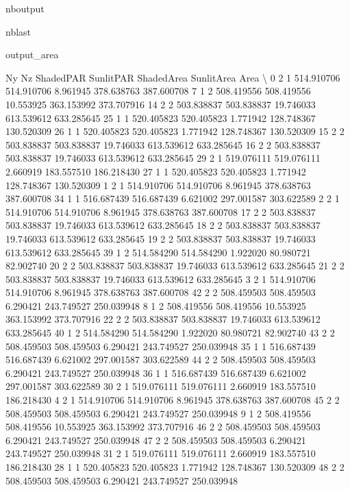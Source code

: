 \documentclass[letterpaper,10pt,english]{sphinxmanual}
\begin{document}
\begin{sphinxuseclass}{nboutput}
\begin{sphinxuseclass}{nblast}
{\begin{sphinxuseclass}{output_area}
\begin{sphinxuseclass}{}
\begin{sphinxVerbatim}[commandchars=\\\{\}]
    Ny  Nz   ShadedPAR   SunlitPAR  ShadedArea  SunlitArea        Area  \textbackslash{}
0    2   1  514.910706  514.910706    8.961945  378.638763  387.600708
7    1   2  508.419556  508.419556   10.553925  363.153992  373.707916
14   2   2  503.838837  503.838837   19.746033  613.539612  633.285645
25   1   1  520.405823  520.405823    1.771942  128.748367  130.520309
26   1   1  520.405823  520.405823    1.771942  128.748367  130.520309
15   2   2  503.838837  503.838837   19.746033  613.539612  633.285645
16   2   2  503.838837  503.838837   19.746033  613.539612  633.285645
29   2   1  519.076111  519.076111    2.660919  183.557510  186.218430
27   1   1  520.405823  520.405823    1.771942  128.748367  130.520309
1    2   1  514.910706  514.910706    8.961945  378.638763  387.600708
34   1   1  516.687439  516.687439    6.621002  297.001587  303.622589
2    2   1  514.910706  514.910706    8.961945  378.638763  387.600708
17   2   2  503.838837  503.838837   19.746033  613.539612  633.285645
18   2   2  503.838837  503.838837   19.746033  613.539612  633.285645
19   2   2  503.838837  503.838837   19.746033  613.539612  633.285645
39   1   2  514.584290  514.584290    1.922020   80.980721   82.902740
20   2   2  503.838837  503.838837   19.746033  613.539612  633.285645
21   2   2  503.838837  503.838837   19.746033  613.539612  633.285645
3    2   1  514.910706  514.910706    8.961945  378.638763  387.600708
42   2   2  508.459503  508.459503    6.290421  243.749527  250.039948
8    1   2  508.419556  508.419556   10.553925  363.153992  373.707916
22   2   2  503.838837  503.838837   19.746033  613.539612  633.285645
40   1   2  514.584290  514.584290    1.922020   80.980721   82.902740
43   2   2  508.459503  508.459503    6.290421  243.749527  250.039948
35   1   1  516.687439  516.687439    6.621002  297.001587  303.622589
44   2   2  508.459503  508.459503    6.290421  243.749527  250.039948
36   1   1  516.687439  516.687439    6.621002  297.001587  303.622589
30   2   1  519.076111  519.076111    2.660919  183.557510  186.218430
4    2   1  514.910706  514.910706    8.961945  378.638763  387.600708
45   2   2  508.459503  508.459503    6.290421  243.749527  250.039948
9    1   2  508.419556  508.419556   10.553925  363.153992  373.707916
46   2   2  508.459503  508.459503    6.290421  243.749527  250.039948
47   2   2  508.459503  508.459503    6.290421  243.749527  250.039948
31   2   1  519.076111  519.076111    2.660919  183.557510  186.218430
28   1   1  520.405823  520.405823    1.771942  128.748367  130.520309
48   2   2  508.459503  508.459503    6.290421  243.749527  250.039948

\end{sphinxVerbatim}
\end{sphinxuseclass}
\end{sphinxuseclass}}
\end{sphinxuseclass}
\end{sphinxuseclass}
\end{document}
